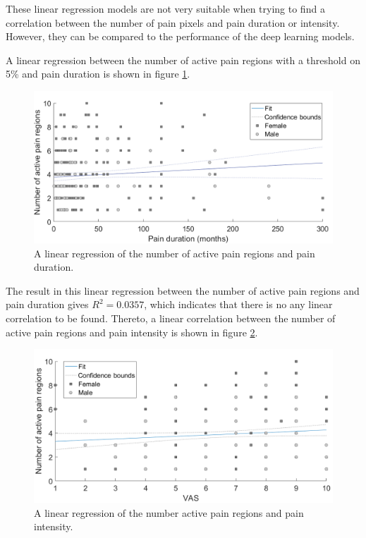 \noindent
These linear regression models are not very suitable when trying to find a correlation between the number of pain pixels and pain duration or intensity. However, they can be compared to the performance of the deep learning models.


\noindent
A linear regression between the number of active pain regions with a threshold on 5\% and pain duration is shown in figure \ref{fig:regDuration}. \newline

\begin{figure} [H]
\centering
\includegraphics[width=1\textwidth]{figures/duraregion}
\caption{A linear regression of the number of active pain regions and pain duration.}
\label{fig:regDuration}
\end{figure}

\noindent
The result in this linear regression between the number of active pain regions and pain duration gives $R^2=0.0357$, which indicates that there is no any linear correlation to be found.\newline
Thereto, a linear correlation between the number of active pain regions and pain intensity is shown in figure \ref{fig:regPain}.

\begin{figure} [H]
\centering
\includegraphics[width=1\textwidth]{figures/vasregion}
\caption{A linear regression of the number active pain regions and pain intensity.}
\label{fig:regPain}
\end{figure}


